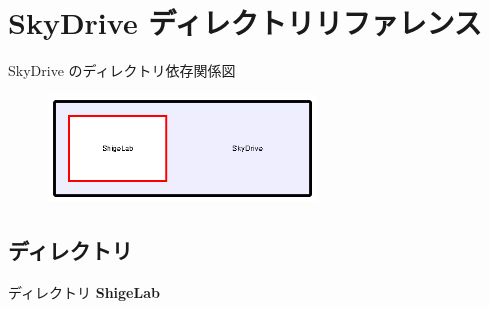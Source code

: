\section{Sky\-Drive ディレクトリリファレンス}
\label{dir_45aeffd6702719c5f3cbf0d005461816}
Sky\-Drive のディレクトリ依存関係図\nopagebreak
\begin{figure}[H]
\begin{center}
\leavevmode
\includegraphics[width=202pt]{dir_45aeffd6702719c5f3cbf0d005461816_dep}
\end{center}
\end{figure}
\subsection*{ディレクトリ}
\begin{DoxyCompactItemize}
\item 
ディレクトリ {\bf Shige\-Lab}
\end{DoxyCompactItemize}
